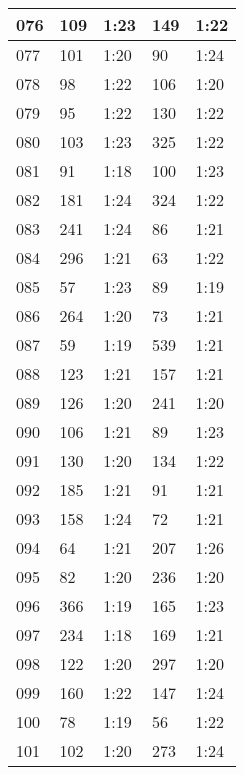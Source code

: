 \begin{center}
\begin{longtable}{|p{2cm}|l|l|l|l|}
076	&   109           &  1:23  &		149     	& 1:22 \\ \hline
077	&   101           &  1:20  &		90      	& 1:24 \\ \hline
078	&   98            &  1:22  &		106     	& 1:20 \\ \hline
079	&   95            &  1:22  &		130     	& 1:22 \\ \hline
080	&   103           &  1:23  &		325     	& 1:22 \\ \hline
081	&   91            &  1:18  &		100     	& 1:23 \\ \hline
082	&   181           &  1:24  &		324     	& 1:22 \\ \hline
083	&   241           &  1:24  &		86          & 1:21 \\ \hline
084	&   296           &  1:21  &		63      	& 1:22 \\ \hline
085	&   57            &  1:23  &		89      	& 1:19 \\ \hline
086	&   264           &  1:20  &		73          & 1:21 \\ \hline
087	&   59            &  1:19  &		539     	& 1:21 \\ \hline
088	&   123           &  1:21  &		157     	& 1:21 \\ \hline
089	&   126           &  1:20  &		241     	& 1:20 \\ \hline
090	&   106           &  1:21  &		89      	& 1:23 \\ \hline
091	&   130           &  1:20  &		134     	& 1:22 \\ \hline
092	&   185           &  1:21  &		91      	& 1:21 \\ \hline
093	&   158           &  1:24  &		72      	& 1:21 \\ \hline
094	&   64            &  1:21  &		207     	& 1:26 \\ \hline
095	&   82            &  1:20  &		236     	& 1:20 \\ \hline
096	&   366           &  1:19  &		165     	& 1:23 \\ \hline
097	&   234           &  1:18  &		169     	& 1:21 \\ \hline
098	&   122           &  1:20  &		297     	& 1:20 \\ \hline
099	&   160           &  1:22  &		147     	& 1:24 \\ \hline
100	&   78            &  1:19  &		56      	& 1:22 \\ \hline
101	&   102           &  1:20  &		273     	& 1:24 \\ \hline

\end{longtable}
\end{center}
